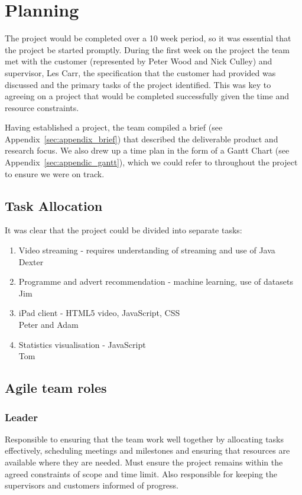 \section{Planning}

The project would be completed over a 10 week period, so it was essential that the project be started promptly. During the first week on the project the team met with the customer (represented by Peter Wood and Nick Culley) and supervisor, Les Carr, the specification that the customer had provided was discussed and the primary tasks of the project identified. This was key to agreeing on a project that would be completed successfully given the time and resource constraints.

Having established a project, the team compiled a brief (see Appendix~\ref{sec:appendix_brief}) that described the deliverable product and research focus. We also drew up a time plan in the form of a Gantt Chart (see Appendix~\ref{sec:appendic_gantt}), which we could refer to throughout the project to ensure we were on track.

\subsection{Task Allocation}
It was clear that the project could be divided into separate tasks:
\begin{enumerate}
\item Video streaming - requires understanding of streaming and use of Java\\
		Dexter
\item Programme and advert recommendation - machine learning, use of datasets\\
		Jim
\item iPad client - HTML5 video, JavaScript, CSS\\
		Peter and Adam
\item Statistics visualisation - JavaScript\\
		Tom
\end{enumerate}

\subsection{Agile team roles}
\subsubsection{Leader}
Responsible to ensuring that the team work well together by allocating tasks effectively, scheduling meetings and milestones and ensuring that resources are available where they are needed. Must ensure the project remains within the agreed constraints of scope and time limit. Also responsible for keeping the supervisors and customers informed of progress.

